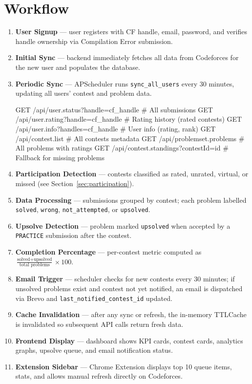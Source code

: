 \documentclass[11pt, a4paper]{article}
\begin{document}
\section{Workflow}

\begin{enumerate}
  \item \textbf{User Signup} --- user registers with CF handle, email, password, and
        verifies handle ownership via Compilation Error submission.
  \item \textbf{Initial Sync} --- backend immediately fetches all data from Codeforces
        for the new user and populates the database.
  \item \textbf{Periodic Sync} --- APScheduler runs \texttt{sync\_all\_users} every 30
        minutes, updating all users' contest and problem data.
\begin{codebox}
GET /api/user.status?handle={cf_handle}     # All submissions
GET /api/user.rating?handle={cf_handle}     # Rating history (rated contests)
GET /api/user.info?handles={cf_handle}      # User info (rating, rank)
GET /api/contest.list                       # All contests metadata
GET /api/problemset.problems                # All problems with ratings
GET /api/contest.standings?contestId={id}   # Fallback for missing problems
\end{codebox}
  \item \textbf{Participation Detection} --- contests classified as rated, unrated,
        virtual, or missed (see Section~\ref{sec:participation}).
  \item \textbf{Data Processing} --- submissions grouped by contest; each problem
        labelled {\color{accentgreen}\texttt{solved}}, {\color{accentwarm}\texttt{wrong}},
        {\color{accentyellow}\texttt{not\_attempted}}, or {\color{accent}\texttt{upsolved}}.
  \item \textbf{Upsolve Detection} --- problem marked \texttt{upsolved} when accepted
        by a \texttt{PRACTICE} submission after the contest.
  \item \textbf{Completion Percentage} --- per-contest metric computed as
        $\frac{\text{solved} + \text{upsolved}}{\text{total problems}} \times 100$.
  \item \textbf{Email Trigger} --- scheduler checks for new contests every 30 minutes;
        if unsolved problems exist and contest not yet notified, an email is dispatched
        via Brevo and \texttt{last\_notified\_contest\_id} updated.
  \item \textbf{Cache Invalidation} --- after any sync or refresh, the in-memory
        TTLCache is invalidated so subsequent API calls return fresh data.
  \item \textbf{Frontend Display} --- dashboard shows KPI cards, contest cards,
        analytics graphs, upsolve queue, and email notification status.
  \item \textbf{Extension Sidebar} --- Chrome Extension displays top 10 queue items,
        stats, and allows manual refresh directly on Codeforces.
\end{enumerate}
\end{document}
